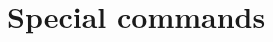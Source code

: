 \documentclass[PhD,binding=0.6cm]{../sapthesis}
\begin{document}
\appendix
\chapter{Special commands }


% 
% 
% 
% 
% 
% 
% 
% 
% 
% 

\end{document}
